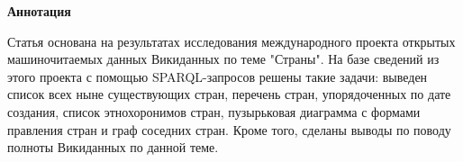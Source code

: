 \textbf{Аннотация}

Статья основана на результатах исследования международного проекта открытых машиночитаемых данных Викиданных по теме "Страны". На базе сведений из этого проекта с помощью SPARQL-запросов решены такие задачи: выведен список всех ныне существующих стран, перечень стран, упорядоченных по дате создания, список этнохоронимов стран, пузырьковая диаграмма с формами правления стран и граф соседних стран. Кроме того, сделаны выводы по поводу полноты Викиданных по данной теме.